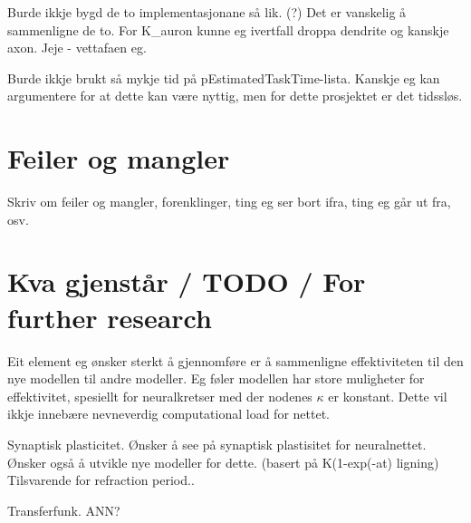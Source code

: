 Burde ikkje bygd de to implementasjonane så lik. (?)
Det er vanskelig å sammenligne de to. For K\_auron kunne eg ivertfall droppa dendrite og kanskje axon.
Jeje - vettafaen eg.

Burde ikkje brukt så mykje tid på pEstimatedTaskTime-lista. Kanskje eg kan argumentere for at dette kan være nyttig, men for dette prosjektet er det tidssløs.

\section{Feiler og mangler}
Skriv om feiler og mangler, forenklinger, ting eg ser bort ifra, ting eg går ut fra, osv.

%
%

\section{Kva gjenstår / TODO / For further research}
Eit element eg ønsker sterkt å gjennomføre er å sammenligne effektiviteten til den nye modellen til andre modeller. Eg føler modellen har store muligheter for effektivitet, spesiellt for neuralkretser med der nodenes $\kappa$ er konstant.
Dette vil ikkje innebære nevneverdig computational load for nettet.

Synaptisk plasticitet. Ønsker å see på synaptisk plastisitet for neuralnettet.
Ønsker også å utvikle nye modeller for dette. (basert på K(1-exp(-at) ligning)
Tilsvarende for refraction period..

Transferfunk. ANN?

%
%
%









